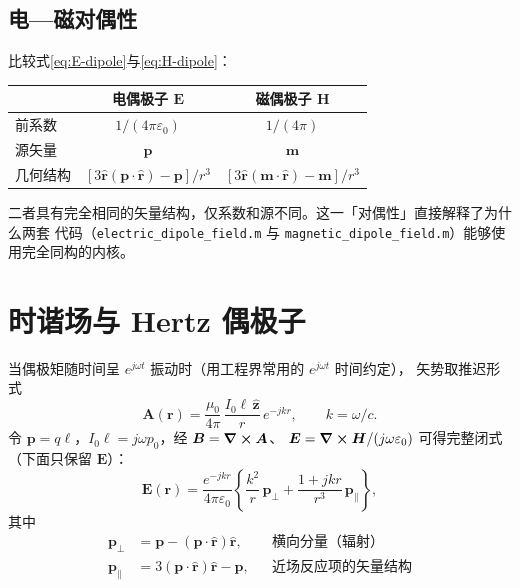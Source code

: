 \documentclass[11pt,a4paper]{article}
\newcommand{\epso}{\varepsilon_{0}}
\newcommand{\muo}{\mu_{0}}
\newcommand{\rhat}{\hat{\bm r}}
\newcommand{\pvec}{\bm p}
\newcommand{\mvec}{\bm m}
\newcommand{\Evec}{\bm E}
\newcommand{\Hvec}{\bm H}
\newcommand{\Bvec}{\bm B}
\newcommand{\Avec}{\bm A}
\newcommand{\rvec}{\bm r}
\begin{document}
\subsection{电—磁对偶性}
比较式\eqref{eq:E-dipole}与\eqref{eq:H-dipole}：
\begin{center}
\begin{tabular}{@{}lcc@{}}\toprule
       & 电偶极子 $\Evec$ & 磁偶极子 $\Hvec$ \\ \midrule
前系数 & $1/(4\pi\epso)$ & $1/(4\pi)$ \\
源矢量 & $\pvec$ & $\mvec$ \\
几何结构 & $[3\rhat(\pvec\cdot\rhat)-\pvec]/r^{3}$ & $[3\rhat(\mvec\cdot\rhat)-\mvec]/r^{3}$ \\ \bottomrule
\end{tabular}
\end{center}
二者具有完全相同的矢量结构，仅系数和源不同。这一「对偶性」直接解释了为什么两套
代码（\texttt{electric\_dipole\_field.m} 与
\texttt{magnetic\_dipole\_field.m}）能够使用完全同构的内核。

\section{时谐场与 Hertz 偶极子}
当偶极矩随时间呈 $e^{j\omega t}$ 振动时（用工程界常用的 $e^{j\omega t}$ 时间约定），
矢势取推迟形式
\begin{equation}
    \Avec(\rvec) = \frac{\muo}{4\pi}\,\frac{I_{0}\ell\,\hat{\bm z}}{r}\,e^{-jkr},
    \qquad k=\omega/c.
\end{equation}
令 $\pvec = q\bm\ell$，$I_{0}\ell = j\omega p_{0}$，经 $\Bvec=\curl\Avec$、
$\Evec=\curl\Hvec/(j\omega\epso)$ 可得完整闭式（下面只保留 $\Evec$）：
\begin{equation}
    \Evec(\rvec) = \frac{e^{-jkr}}{4\pi\epso}\left\{
        \frac{k^{2}}{r}\,\pvec_{\perp} + \frac{1+jkr}{r^{3}}\,\pvec_{\parallel}
    \right\},
    \label{eq:hertz-E}
\end{equation}
其中
\begin{align}
    \pvec_{\perp}    &= \pvec - (\pvec\cdot\rhat)\rhat,
                        & & \text{横向分量（辐射）}\\
    \pvec_{\parallel} &= 3(\pvec\cdot\rhat)\rhat - \pvec,
                        & & \text{近场反应项的矢量结构}
\end{align}
\end{document}
